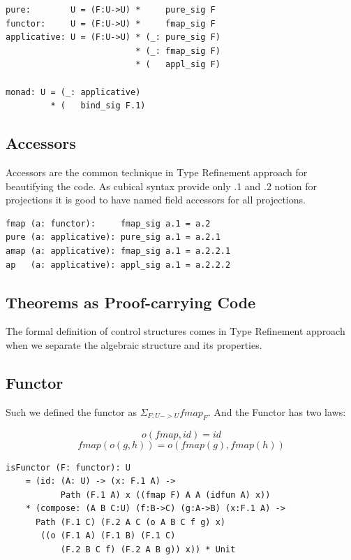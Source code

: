 \documentclass{article}
\begin{document}
\begin{lstlisting}[mathescape=true]
pure:        U = (F:U->U) *     pure_sig F
functor:     U = (F:U->U) *     fmap_sig F
applicative: U = (F:U->U) * (_: pure_sig F)
                          * (_: fmap_sig F)
                          * (   appl_sig F)

monad: U = (_: applicative)
         * (   bind_sig F.1)
\end{lstlisting}

\subsection*{Accessors}

Accessors are the common technique in Type Refinement approach for beautifying the code.
As cubical syntax provide only .1 and .2 notion for projections it is good to have
named field accessors for all projections.

\begin{lstlisting}[mathescape=true]
fmap (a: functor):     fmap_sig a.1 = a.2
pure (a: applicative): pure_sig a.1 = a.2.1
amap (a: applicative): fmap_sig a.1 = a.2.2.1
ap   (a: applicative): appl_sig a.1 = a.2.2.2
\end{lstlisting}

\subsection*{Theorems as Proof-carrying Code}

The formal definition of control structures comes in Type Refinement approach when
we separate the algebraic structure and its properties.

\subsection*{Functor}

Such we defined the functor as $\Sigma_{F:U->U} fmap_F$. And the Functor has two laws:

\begin{equation} o(fmap,id) = id \end{equation}
\begin{equation} fmap(o(g,h)) = o(fmap(g),fmap(h)) \end{equation}

\begin{lstlisting}[mathescape=true]
isFunctor (F: functor): U
    = (id: (A: U) -> (x: F.1 A) ->
           Path (F.1 A) x ((fmap F) A A (idfun A) x))
    * (compose: (A B C:U) (f:B->C) (g:A->B) (x:F.1 A) ->
      Path (F.1 C) (F.2 A C (o A B C f g) x)
       ((o (F.1 A) (F.1 B) (F.1 C)
           (F.2 B C f) (F.2 A B g)) x)) * Unit
\end{lstlisting}
\end{document}
